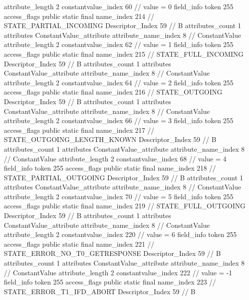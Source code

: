 {{{{{{{					attribute_length	2
					constantvalue_index	60		// value = 0
				}
				}
			}
			field_info {
				token	255
				access_flags	public static final
				name_index	214		// STATE_PARTIAL_INCOMING
				Descriptor_Index	59		// B
				attributes_count	1
				attributes {
				ConstantValue_attribute {
					attribute_name_index	8		// ConstantValue
					attribute_length	2
					constantvalue_index	62		// value = 1
				}
				}
			}
			field_info {
				token	255
				access_flags	public static final
				name_index	215		// STATE_FULL_INCOMING
				Descriptor_Index	59		// B
				attributes_count	1
				attributes {
				ConstantValue_attribute {
					attribute_name_index	8		// ConstantValue
					attribute_length	2
					constantvalue_index	64		// value = 2
				}
				}
			}
			field_info {
				token	255
				access_flags	public static final
				name_index	216		// STATE_OUTGOING
				Descriptor_Index	59		// B
				attributes_count	1
				attributes {
				ConstantValue_attribute {
					attribute_name_index	8		// ConstantValue
					attribute_length	2
					constantvalue_index	66		// value = 3
				}
				}
			}
			field_info {
				token	255
				access_flags	public static final
				name_index	217		// STATE_OUTGOING_LENGTH_KNOWN
				Descriptor_Index	59		// B
				attributes_count	1
				attributes {
				ConstantValue_attribute {
					attribute_name_index	8		// ConstantValue
					attribute_length	2
					constantvalue_index	68		// value = 4
				}
				}
			}
			field_info {
				token	255
				access_flags	public static final
				name_index	218		// STATE_PARTIAL_OUTGOING
				Descriptor_Index	59		// B
				attributes_count	1
				attributes {
				ConstantValue_attribute {
					attribute_name_index	8		// ConstantValue
					attribute_length	2
					constantvalue_index	70		// value = 5
				}
				}
			}
			field_info {
				token	255
				access_flags	public static final
				name_index	219		// STATE_FULL_OUTGOING
				Descriptor_Index	59		// B
				attributes_count	1
				attributes {
				ConstantValue_attribute {
					attribute_name_index	8		// ConstantValue
					attribute_length	2
					constantvalue_index	220		// value = 6
				}
				}
			}
			field_info {
				token	255
				access_flags	public static final
				name_index	221		// STATE_ERROR_NO_T0_GETRESPONSE
				Descriptor_Index	59		// B
				attributes_count	1
				attributes {
				ConstantValue_attribute {
					attribute_name_index	8		// ConstantValue
					attribute_length	2
					constantvalue_index	222		// value = -1
				}
				}
			}
			field_info {
				token	255
				access_flags	public static final
				name_index	223		// STATE_ERROR_T1_IFD_ABORT
				Descriptor_Index	59		// B
}}}}}
